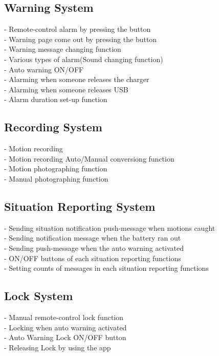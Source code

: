 \documentclass[12pt]{article}
\begin{document}
\subsection{Warning System}
- Remote-control alarm by pressing the button\\
- Warning page come out by pressing the button\\
- Warning message changing function\\
- Various types of alarm(Sound changing function)\\
- Auto warning ON/OFF\\
- Alarming when someone releases the charger\\
- Alarming when someone releases USB\\
- Alarm duration set-up function\\


\subsection{Recording System}
- Motion recording\\
- Motion recording Auto/Manual conversiong function\\
- Motion photographing function\\
- Manual photographing function\\

\subsection{Situation Reporting System}
- Sending situation notification push-message when motions caught\\
- Sending notification message when the battery ran out\\
- Sending push-message when the auto warning activated\\
- ON/OFF buttons of each situation reporting functions\\
- Setting counts of messages in each situation reporting functions\\

\subsection{Lock System}
- Manual remote-control lock function\\
- Locking when auto warning activated\\
- Auto Warning Lock ON/OFF button\\
- Releasing Lock by using the app\\
\end{document}
